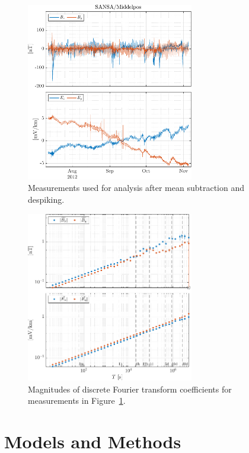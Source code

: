 \documentclass[draft,linenumbers]{agujournal2018}
\begin{document}
\clearpage

\begin{figure}[h!]
  \centering
  \includegraphics[width=0.65\textwidth]{figures/tsplot-original-Middelpos-tf1.pdf}
  \caption{Measurements used for analysis after mean subtraction and despiking.}
  \label{fig:timeseries}
\end{figure}

\begin{figure}[h!]
  \centering
  \includegraphics[width=0.65\textwidth]{figures/dftplot-original-averaged-magnitudes-Middelpos-tf1.pdf}
  \caption{Magnitudes of discrete Fourier transform coefficients for measurements in Figure~\ref{fig:timeseries}.}
  \label{fig:dft}
\end{figure}

\clearpage

\section{Models and Methods}
\label{section:Models_and_Methods}
\end{document}
